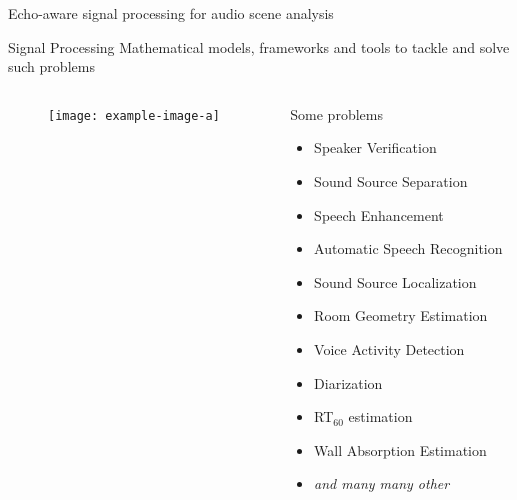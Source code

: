 \begin{frame}[t]{Echo-aware \alert{signal processing for audio scene analysis}}

    \begin{mydefblock}{Signal Processing}
        Mathematical models, frameworks and tools to tackle and solve such problems
    \end{mydefblock}

    \vfill
    \begin{columns}[onlytextwidth]
        \begin{column}{0.55\textwidth}
            \begin{figure}
                \texttt{[image: example-image-a]}
            \end{figure}
        \end{column}\hfill
        \begin{column}{0.42\textwidth}
            Some problems\hfill{}
            \begin{itemize}
                \item Speaker Verification
                \item Sound Source Separation 
                \item Speech Enhancement
                \item Automatic Speech Recognition 
                \item Sound Source Localization
                \item Room Geometry Estimation
                \item Voice Activity Detection
                \item Diarization
                \item RT$_{60}$ estimation
                \item Wall Absorption Estimation
                \item \textit{and many many other}
            \end{itemize}


\end{column}
\end{columns}
\end{frame}

